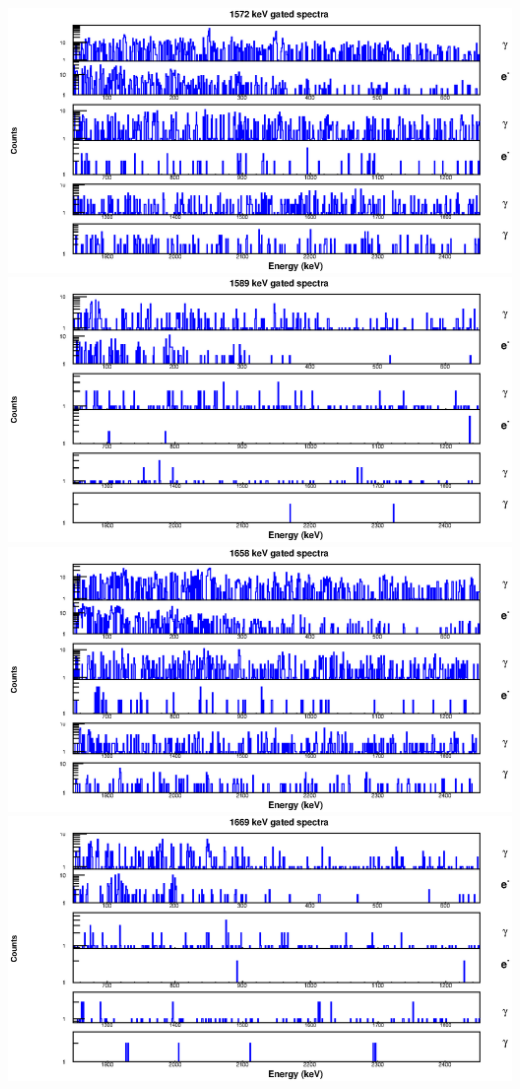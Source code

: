 \begin{landscape}
\includegraphics[scale=1.2]{154Gd_Appendix/1572_combined.eps}
\includegraphics[scale=1.2]{154Gd_Appendix/1589_combined.eps}
\includegraphics[scale=1.2]{154Gd_Appendix/1658_combined.eps}
\includegraphics[scale=1.2]{154Gd_Appendix/1669_combined.eps}

\end{landscape}
